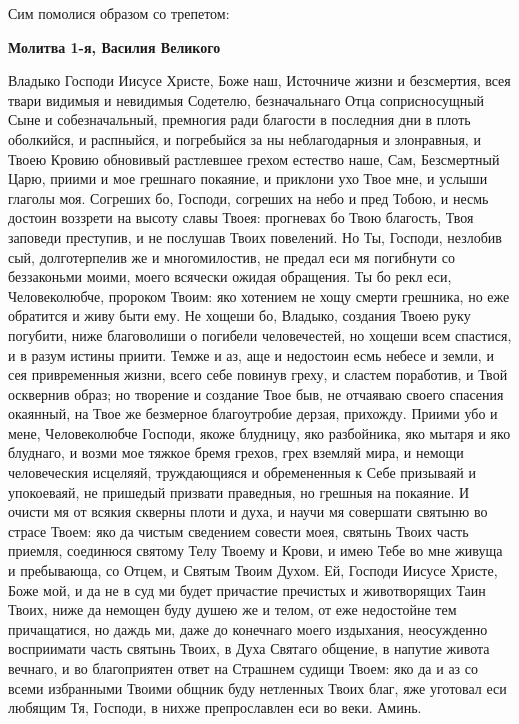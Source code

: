 Сим помолися образом со трепетом:


\bfseries Молитва 1-я, Василия Великого\normalfont{}


Владыко Господи Иисусе Христе, Боже наш, Источниче жизни и безсмертия, всея твари видимыя и невидимыя Содетелю, безначальнаго Отца соприсносущный Сыне и собезначальный, премногия ради благости в последния дни в плоть оболкийся, и распныйся, и погребыйся за ны неблагодарныя и злонравныя, и Твоею Кровию обновивый растлевшее грехом естество наше, Сам, Безсмертный Царю, приими и мое грешнаго покаяние, и приклони ухо Твое мне, и услыши глаголы моя. Согреших бо, Господи, согреших на небо и пред Тобою, и несмь достоин воззрети на высоту славы Твоея: прогневах бо Твою благость, Твоя заповеди преступив, и не послушав Твоих повелений. Но Ты, Господи, незлобив сый, долготерпелив же и многомилостив, не предал еси мя погибнути со беззаконьми моими, моего всячески ожидая обращения. Ты бо рекл еси, Человеколюбче, пророком Твоим: яко хотением не хощу смерти грешника, но еже обратится и живу быти ему. Не хощеши бо, Владыко, создания Твоею руку погубити, ниже благоволиши о погибели человечестей, но хощеши всем спастися, и в разум истины приити. Темже и аз, аще и недостоин есмь небесе и земли, и сея привременныя жизни, всего себе повинув греху, и сластем поработив, и Твой осквернив образ; но творение и создание Твое быв, не отчаяваю своего спасения окаянный, на Твое же безмерное благоутробие дерзая, прихожду. Приими убо и мене, Человеколюбче Господи, якоже блудницу, яко разбойника, яко мытаря и яко блуднаго, и возми мое тяжкое бремя грехов, грех вземляй мира, и немощи человеческия исцеляяй, труждающияся и обремененныя к Себе призываяй и упокоеваяй, не пришедый призвати праведныя, но грешныя на покаяние. И очисти мя от всякия скверны плоти и духа, и научи мя совершати святыню во страсе Твоем: яко да чистым сведением совести моея, святынь Твоих часть приемля, соединюся святому Телу Твоему и Крови, и имею Тебе во мне живуща и пребывающа, со Отцем, и Святым Твоим Духом. Ей, Господи Иисусе Христе, Боже мой, и да не в суд ми будет причастие пречистых и животворящих Таин Твоих, ниже да немощен буду душею же и телом, от еже недостойне тем причащатися, но даждь ми, даже до конечнаго моего издыхания, неосужденно восприимати часть святынь Твоих, в Духа Святаго общение, в напутие живота вечнаго, и во благоприятен ответ на Страшнем судищи Твоем: яко да и аз со всеми избранными Твоими общник буду нетленных Твоих благ, яже уготовал еси любящим Тя, Господи, в нихже препрославлен еси во веки. Аминь.




